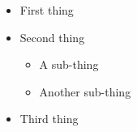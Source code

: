 \documentclass[a4paper,12pt]{article}
\begin{document}
\begin{itemize}
  \item[-] First thing

  \item[+] Second thing
    \begin{itemize}
      \item[Fish] A sub-thing

      \item[Plants] Another sub-thing
    \end{itemize}

  \item[Q] Third thing
\end{itemize}
\end{document}
